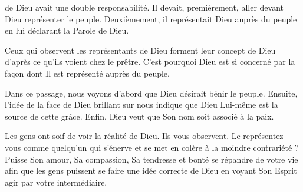 \dvrule






 de Dieu avait une double responsabilité.
 Il devait, premièrement, aller devant Dieu représenter le peuple.
 Deuxièmement, il représentait Dieu auprès du peuple
 en lui déclarant la Parole de Dieu. 


Ceux qui observent les représentants de Dieu forment leur concept de Dieu
 d'après ce qu'ils voient chez le prêtre.
 C'est pourquoi Dieu est si concerné par la façon dont Il est représenté
 auprès du peuple. 

Dans ce passage, nous voyons d'abord que Dieu désirait bénir le peuple.
 Ensuite, l'idée de la face de Dieu brillant sur nous indique
 que Dieu Lui-même est la source de cette grâce.
 Enfin, Dieu veut que Son nom soit associé à la paix. 

Les gens ont soif de voir la réalité de Dieu. Ils vous observent.
 Le représentez-vous comme quelqu'un qui s'énerve et se met en colère
 à la moindre contrariété ? Puisse Son amour, Sa compassion,
 Sa tendresse et bonté se répandre de votre vie afin que les gens
 puissent se faire une idée correcte de Dieu en voyant
 Son Esprit agir par votre intermédiaire. 

\dvrule







